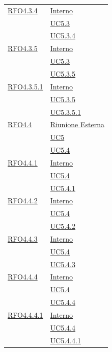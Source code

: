 \begin{longtable}{|>{\centering}m{5cm}|m{5cm}<{\centering}|}
\hyperlink{RFO4.3.4}{RFO4.3.4} & \hyperlink{Interno}{Interno}\\
& \hyperref[UC5.3]{UC5.3}\\
& \hyperref[UC5.3.4]{UC5.3.4}\\ \hline

\hyperlink{RFO4.3.5}{RFO4.3.5} & \hyperlink{Interno}{Interno}\\
& \hyperref[UC5.3]{UC5.3}\\
& \hyperref[UC5.3.5]{UC5.3.5}\\ \hline

\hyperlink{RFO4.3.5.1}{RFO4.3.5.1} & \hyperlink{Interno}{Interno}\\
& \hyperref[UC5.3.5]{UC5.3.5}\\
& \hyperref[UC5.3.5.1]{UC5.3.5.1}\\ \hline

\hyperlink{RFO4.4}{RFO4.4} & \hyperlink{Riunione Esterna}{Riunione Esterna}\\
& \hyperref[UC5]{UC5}\\
& \hyperref[UC5.4]{UC5.4}\\ \hline

\hyperlink{RFO4.4.1}{RFO4.4.1} & \hyperlink{Interno}{Interno}\\
& \hyperref[UC5.4]{UC5.4}\\
& \hyperref[UC5.4.1]{UC5.4.1}\\ \hline

\hyperlink{RFO4.4.2}{RFO4.4.2} & \hyperlink{Interno}{Interno}\\
& \hyperref[UC5.4]{UC5.4}\\
& \hyperref[UC5.4.2]{UC5.4.2}\\ \hline

\hyperlink{RFO4.4.3}{RFO4.4.3} & \hyperlink{Interno}{Interno}\\
& \hyperref[UC5.4]{UC5.4}\\
& \hyperref[UC5.4.3]{UC5.4.3}\\ \hline

\hyperlink{RFO4.4.4}{RFO4.4.4} & \hyperlink{Interno}{Interno}\\
& \hyperref[UC5.4]{UC5.4}\\
& \hyperref[UC5.4.4]{UC5.4.4}\\ \hline

\hyperlink{RFO4.4.4.1}{RFO4.4.4.1} & \hyperlink{Interno}{Interno}\\
& \hyperref[UC5.4.4]{UC5.4.4}\\
& \hyperref[UC5.4.4.1]{UC5.4.4.1}\\ \hline


\end{longtable}
